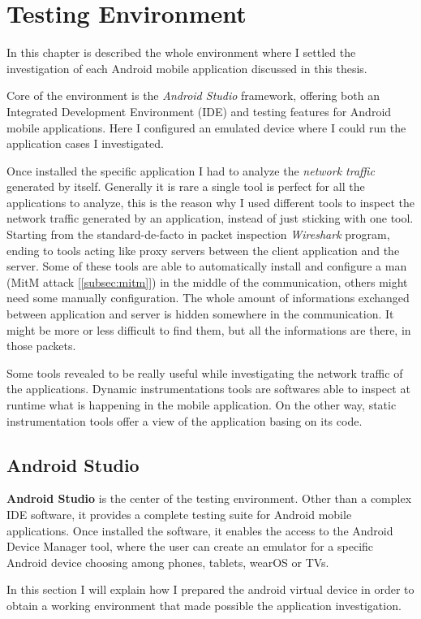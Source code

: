 \chapter{Testing Environment}
\label{chap:testing_environment}
	
	\par In this chapter is described the whole environment where I settled the investigation of each Android mobile application discussed in this thesis.
	\par Core of the environment is the \textit{Android Studio} framework, offering both an Integrated Development Environment (IDE) and testing features for Android mobile applications. Here I configured an emulated device where I could run the application cases I investigated.
	\par Once installed the specific application I had to analyze the \textit{network traffic} generated by itself. Generally it is rare a single tool is perfect for all the applications to analyze, this is the reason why I used different tools to inspect the network traffic generated by an application, instead of just sticking with one tool. Starting from the standard-de-facto in packet inspection \textit{Wireshark} program, ending to tools acting like proxy servers between the client application and the server. Some of these tools are able to automatically install and configure a man (MitM attack [\ref{subsec:mitm}]) in the middle of the communication, others might need some manually configuration. \newline
	The whole amount of informations exchanged between application and server is hidden somewhere in the communication. It might be more or less difficult to find them, but all the informations are there, in those packets.
	\par Some tools revealed to be really useful while investigating the network traffic of the applications. Dynamic instrumentations tools are softwares able to inspect at runtime what is happening in the mobile application. On the other way, static instrumentation tools offer a view of the application basing on its code.
	
	\section{Android Studio}
		\par \textbf{Android Studio} is the center of the testing environment. Other than a complex IDE software, it provides a complete testing suite for Android mobile applications. Once installed the software, it enables the access to the Android Device Manager tool, where the user can create an emulator for a specific Android device choosing among phones, tablets, wearOS or TVs. 
		\par In this section I will explain how I prepared the android virtual device in order to obtain a working environment that made possible the application investigation.
		
